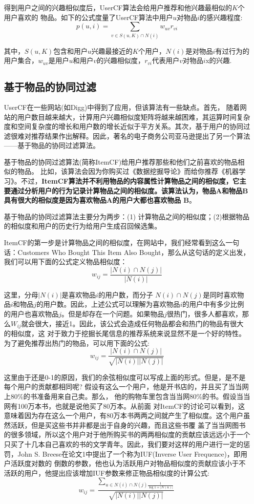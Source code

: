 \documentclass[12pt]{article}
\begin{document}
得到用户之间的兴趣相似度后，UserCF算法会给用户推荐和他兴趣最相似的$K$个用户喜欢的 物品。如下的公式度量了UserCF算法中用户$u$对物品$i$的感兴趣程度:
$$
p(u,i) = \sum_{v \in S(u,K) \cap N(i)} w_{uv}r_{vi}
$$

其中，$S(u, K)$包含和用户$u$兴趣最接近的$K$个用户，$N(i)$是对物品$i$有过行为的用户集合，$w_{uv}$是用户$u$和用户$v$的兴趣相似度，$r_{vi}$代表用户$v$对物品$i$x的兴趣.


\subsection{基于物品的协同过滤}
UserCF在一些网站(如Digg)中得到了应用，但该算法有一些缺点。首先， 随着网站的用户数目越来越大，计算用户兴趣相似度矩阵将越来越困难，其运算时间复杂度和空间复杂度的增长和用户数的增长近似于平方关系。其次，基于用户的协同过滤很难对推荐结果作出解释。因此，著名的电子商务公司亚马逊提出了另一个算法——基于物品的协同过滤算法。


基于物品的协同过滤算法(简称ItemCF)给用户推荐那些和他们之前喜欢的物品相似的物品。 比如，该算法会因为你购买过《数据挖掘导论》而给你推荐《机器学习》。不过，\textbf{ItemCF算法并不利用物品的内容属性计算物品之间的相似度，它主要通过分析用户的行为记录计算物品之间的相似度。该算法认为，物品A和物品B具有很大的相似度是因为喜欢物品A的用户大都也喜欢物品 B}。

基于物品的协同过滤算法主要分为两步：(1) 计算物品之间的相似度；(2)根据物品的相似度和用户的历史行为给用户生成召回候选集。

ItemCF的第一步是计算物品之间的相似度，在网站中，我们经常看到这么一句话：Customers Who Bought This Item Also Bought，那么从这句话的定义出发，我们可以用下面的公式定义物品相似度：
$$
w_{ij} = \frac{|N(i) \cap N(j)|}{|N(i)|}
$$

这里，分母$|N(i)|$是喜欢物品$i$的用户数，而分子 $N(i)\cap N(j) $是同时喜欢物品$i$和物品$j$的用户数。因此，上述公式可以理解为喜欢物品$i$的用户中有多少比例的用户也喜欢物品$j$。但是却存在一个问题。如果物品$j$很热门，很多人都喜欢，那么$W_{ij}$就会很大，接近1。因此，该公式会造成任何物品都会和热门的物品有很大的相似度，这 对于致力于挖掘长尾信息的推荐系统来说显然不是一个好的特性。为了避免推荐出热门的物品，可以用下面的公式:
$$
w_{ij} = \frac{|N(i) \cap N(j)|}{\sqrt{|N(i)||N(j)|}}
$$

这里由于还是0-1的原因，我们的余弦相似度可以写成上面的形式。但是，是不是每个用户的贡献都相同呢? 假设有这么一个用户，他是开书店的，并且买了当当网上80\%的书准备用来自己卖。那么， 他的购物车里包含当当网80\%的书。假设当当网有100万本书，也就是说他买了80万本。从前面 对ItemCF的讨论可以看到，这意味着因为存在这么一个用户，有80万本书两两之间就产生了相似度。这个用户虽然活跃，但是买这些书并非都是出于自身的兴趣，而且这些书覆 盖了当当网图书的很多领域，所以这个用户对于他所购买书的两两相似度的贡献应该远远小于一个只买了十几本自己喜欢的书的文学青年。因此，我们要对这样的用户进行一定的惩罚，John S. Breese在论文1中提出了一个称为IUF(Inverse User Frequence)，即用户活跃度对数的 倒数的参数，他也认为活跃用户对物品相似度的贡献应该小于不活跃的用户，他提出应该增加IUF参数来修正物品相似度的计算公式:
$$
w_{ij} = \frac{\sum_{u \in N(i) \cap N(j)\frac{1}{\log 1 + |N(u)|}}}{\sqrt{|N(i)||N(j)|}}
$$
\end{document}

